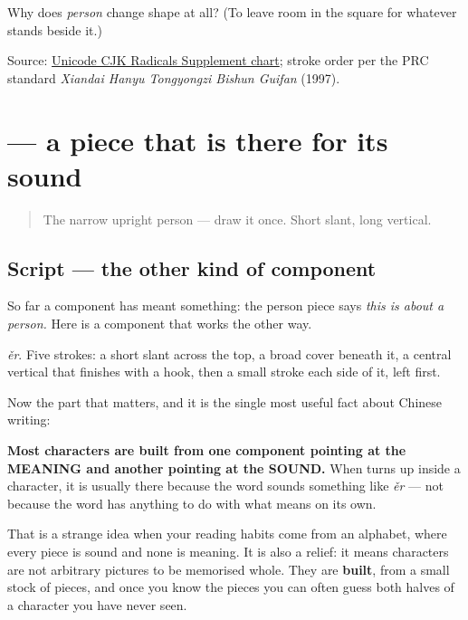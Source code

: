\begin{tcolorbox}[breakable,colback=teal!4,colframe=teal!35!black,title={Before you move on}]
Why does \emph{person} change shape at all? (To leave room in the square for whatever stands beside it.)

Source: \href{https://www.unicode.org/charts/PDF/U2E80.pdf}{Unicode CJK Radicals Supplement chart}; stroke order per the PRC standard \emph{Xiandai Hanyu Tongyongzi Bishun Guifan} (1997).
\end{tcolorbox}
\section[\texorpdfstring{\zh{尔} (ěr)}{尔 (ěr)}]{ — a piece that is there for its sound}

\label{lesson:ZH-W01-er}



\begin{quote}
The narrow upright person — draw it once. Short slant, long vertical.
\end{quote}

\subsection*{Script — the other kind of component}

So far a component has meant something: the person piece says \emph{this is about a person.} Here is a component that works the other way.

\begin{quote}
\end{quote}

\textbf{} \emph{ěr}. Five strokes: a short slant across the top, a broad cover beneath it, a central vertical that finishes with a hook, then a small stroke each side of it, left first.

Now the part that matters, and it is the single most useful fact about Chinese writing:

\textbf{Most characters are built from one component pointing at the MEANING and another pointing at the SOUND.} When  turns up inside a character, it is usually there because the word sounds something like \emph{ěr} — not because the word has anything to do with what  means on its own.

That is a strange idea when your reading habits come from an alphabet, where every piece is sound and none is meaning. It is also a relief: it means characters are not arbitrary pictures to be memorised whole. They are \textbf{built}, from a small stock of pieces, and once you know the pieces you can often guess both halves of a character you have never seen.

